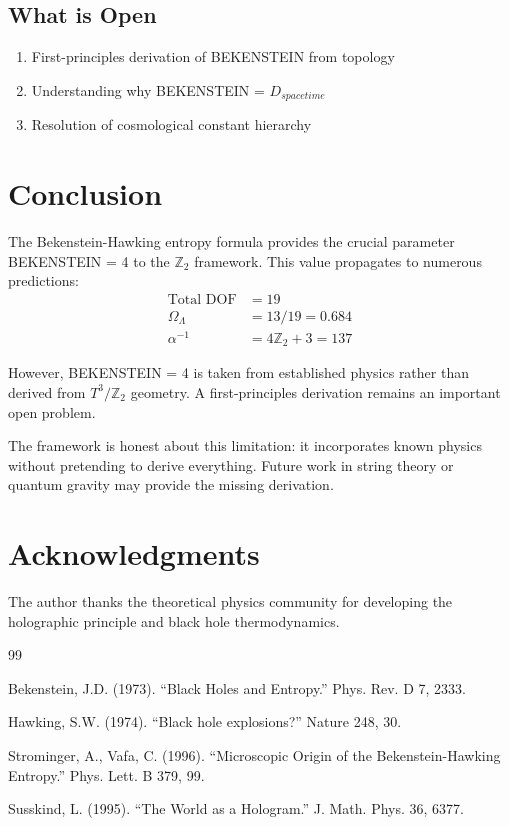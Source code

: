 \documentclass[12pt,a4paper]{article}
\begin{document}
\subsection{What is Open}

\begin{enumerate}
    \item First-principles derivation of BEKENSTEIN from topology
    \item Understanding why BEKENSTEIN = $D_{spacetime}$
    \item Resolution of cosmological constant hierarchy
\end{enumerate}

\section{Conclusion}

The Bekenstein-Hawking entropy formula provides the crucial parameter BEKENSTEIN = 4 to the $\mathbb{Z}_2$ framework. This value propagates to numerous predictions:
\begin{align}
\text{Total DOF} &= 19 \\
\Omega_\Lambda &= 13/19 = 0.684 \\
\alpha^{-1} &= 4\mathbb{Z}_2 + 3 = 137
\end{align}

However, BEKENSTEIN = 4 is taken from established physics rather than derived from $T^3/\mathbb{Z}_2$ geometry. A first-principles derivation remains an important open problem.

The framework is honest about this limitation: it incorporates known physics without pretending to derive everything. Future work in string theory or quantum gravity may provide the missing derivation.

\section*{Acknowledgments}

The author thanks the theoretical physics community for developing the holographic principle and black hole thermodynamics.

\begin{thebibliography}{99}

Bekenstein, J.D. (1973). ``Black Holes and Entropy.'' Phys. Rev. D 7, 2333.

Hawking, S.W. (1974). ``Black hole explosions?'' Nature 248, 30.

Strominger, A., Vafa, C. (1996). ``Microscopic Origin of the Bekenstein-Hawking Entropy.'' Phys. Lett. B 379, 99.

Susskind, L. (1995). ``The World as a Hologram.'' J. Math. Phys. 36, 6377.

\end{thebibliography}
\end{document}
